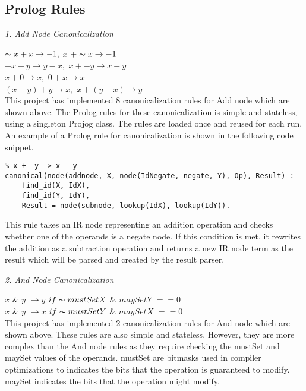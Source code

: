 \subsection{{Prolog Rules}}

\textit{1. Add Node Canonicalization}
\smallbreak

$\thicksim x + x \rightarrow -1,$ $x$ $+ \thicksim x \rightarrow -1$\\

$-x + y \rightarrow y - x,$ $ x + -y \rightarrow x - y$\\

$x + 0 \rightarrow x,$ $ 0 + x \rightarrow x$\\

$(x - y) + y \rightarrow x,$ $ x + (y - x) \rightarrow y$\\

This project has implemented 8 canonicalization rules for Add node which are shown above.
The Prolog rules for these canonicalization is simple and stateless, using a singleton Projog class. 
The rules are loaded once and reused for each run. 
An example of a Prolog rule for canonicalization is shown in the following code snippet. 

\begin{lstlisting}
% x + -y -> x - y
canonical(node(addnode, X, node(IdNegate, negate, Y), Op), Result) :-
    find_id(X, IdX),
    find_id(Y, IdY),
    Result = node(subnode, lookup(IdX), lookup(IdY)).
\end{lstlisting}
    
This rule takes an IR node representing an addition operation and checks whether one of the operands is a negate node. 
If this condition is met, it rewrites the addition as a subtraction operation and returns a new IR node term
as the result which will be parsed and created by the result parser.

\bigbreak
\textit{2. And Node Canonicalization}
\smallbreak

$x$ $\&$ $y$ $\rightarrow y$ $if \thicksim mustSetX$ $\&$ $maySetY$ $== 0$\\

$x$ $\&$ $y$ $\rightarrow x$ $if \thicksim mustSetY$ $\&$ $maySetX$ $== 0$\\

This project has implemented 2 canonicalization rules for And node which are shown above.
These rules are also simple and stateless.
However, they are more complex than the And node rules as they require checking the mustSet and maySet values of the operands.
mustSet are bitmasks used in compiler optimizations to indicates the bits that the operation is guaranteed to modify. maySet indicates the bits that the operation might modify.

